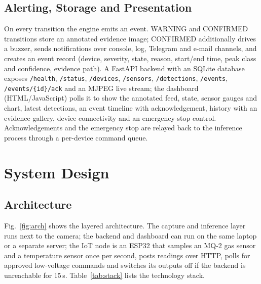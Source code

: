 \documentclass[conference]{IEEEtran}
\begin{document}
\subsection{Alerting, Storage and Presentation}
On every transition the engine emits an event. WARNING and CONFIRMED transitions store an annotated evidence image; CONFIRMED additionally drives a buzzer, sends notifications over console, log, Telegram and e-mail channels, and creates an event record (device, severity, state, reason, start/end time, peak class and confidence, evidence path). A FastAPI backend with an SQLite database exposes \texttt{/health}, \texttt{/status}, \texttt{/devices}, \texttt{/sensors}, \texttt{/detections}, \texttt{/events}, \texttt{/events/\{id\}/ack} and an MJPEG live stream; the dashboard (HTML/JavaScript) polls it to show the annotated feed, state, sensor gauges and chart, latest detections, an event timeline with acknowledgement, history with an evidence gallery, device connectivity and an emergency-stop control. Acknowledgements and the emergency stop are relayed back to the inference process through a per-device command queue.

\section{System Design}\label{sec:design}
\subsection{Architecture}
Fig.~\ref{fig:arch} shows the layered architecture. The capture and inference layer runs next to the camera; the backend and dashboard can run on the same laptop or a separate server; the IoT node is an ESP32 that samples an MQ-2 gas sensor and a temperature sensor once per second, posts readings over HTTP, polls for approved low-voltage commands and switches its outputs off if the backend is unreachable for 15\,s. Table~\ref{tab:stack} lists the technology stack.
\end{document}
